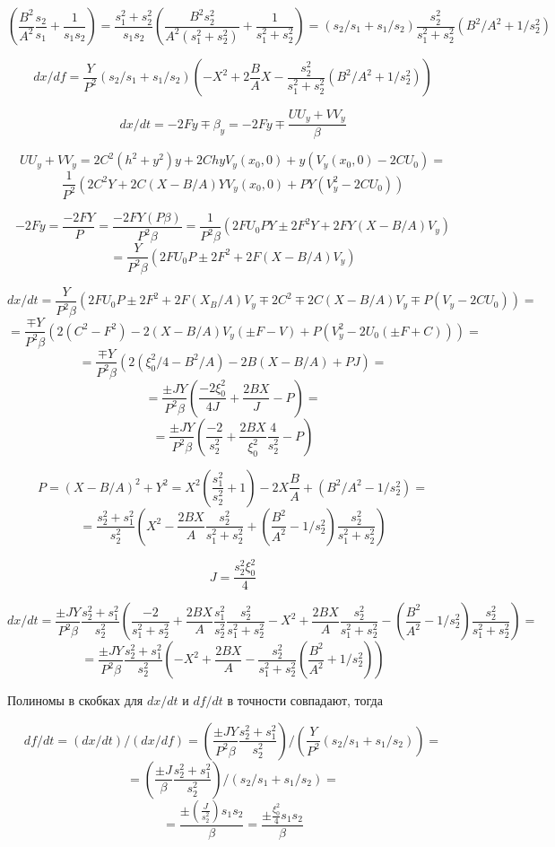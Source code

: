 $$(\frac{B^2}{A^2}\frac{s_2}{s_1}+ \frac{1}{s_1 s_2}) = \frac{s_1^2+s_2^2}{s_1 s_2} (\frac{B^2 s_2^2}{A^2(s_1^2+s_2^2)} + \frac{1}{s_1^2+s_2^2}) = (s_2/s_1 + s_1/s_2) \frac{s_2^2}{s_1^2+s_2^2} (B^2/A^2 + 1/s_2^2)$$

$$dx/df = \frac{Y}{P^2}(s_2/s_1 + s_1/s_2) \left(-X^2 + 2 \frac{B}{A}X - \frac{s_2^2}{s_1^2+s_2^2}(B^2/A^2+1/s_2^2) \right)$$


$$dx/dt = -2Fy \mp \beta_y = -2Fy \mp \frac{UU_y+VV_y}{\beta}$$

$$UU_y+VV_y = 2C^2 (h^2+y^2)y + 2Chy V_y(x_0,0) + y (V_y(x_0,0)-2CU_0) = $$
$$\frac{1}{P^2} \left( 2C^2Y + 2C(X-B/A)Y V_y(x_0,0) + P Y (V_y^2-2CU_0) \right)$$

$$-2Fy = \frac{-2FY}{P} = \frac{-2FY (P \beta)}{P^2 \beta} = \frac{1}{P^2 \beta} \left( 2FU_0PY \pm 2F^2 Y + 2FY (X-B/A) V_y \right)$$
$$=\frac{Y}{P^2 \beta} \left( 2FU_0P \pm 2F^2  + 2F (X-B/A) V_y \right)$$

$$dx/dt = \frac{Y}{P^2 \beta} \left( 2FU_0 P \pm 2F^2 + 2F(X_B/A)V_y \mp 2C^2 \mp 2C(X-B/A)V_y \mp P(V_y-2CU_0) \right) = $$
$$=\frac{\mp Y}{P^2 \beta} \left( 2(C^2-F^2) - 2(X-B/A)V_y (\pm F - V) + P(V_y^2 - 2U_0 (\pm F + C)) \right) = $$
$$=\frac{\mp Y}{P^2 \beta} \left( 2(\xi_0^2/4 - B^2/A) - 2B(X-B/A) + PJ \right)= $$
$$=\frac{\pm J Y}{P^2 \beta} \left( \frac{-2 \xi_0^2}{4J} + \frac{2BX}{J} - P \right) = $$
$$=\frac{\pm J Y}{P^2 \beta} \left( \frac{-2}{s_2^2} + \frac{2BX}{\xi_0^2} \frac{4}{s_2^2} - P \right)$$


$$P = (X-B/A)^2 +Y^2 = X^2(\frac{s_1^2}{s_2^2}+1) -2X \frac{B}{A} + (B^2/A^2 - 1/s_2^2)=$$
$$=\frac{s_2^2+s_1^2}{s_2^2} \left( X^2 - \frac{2BX}{A} \frac{s_2^2}{s_1^2+s_2^2} + (\frac{B^2}{A^2}-1/s_2^2)\frac{s_2^2}{s_1^2+s_2^2} \right)$$

$$J = \frac{s_2^2 \xi_0^2}{4}$$

$$dx/dt = \frac{\pm J Y}{P^2 \beta} \frac{s_2^2+s_1^2}{s_2^2} \left( \frac{-2}{s_1^2+s_2^2} + \frac{2BX}{A} \frac{s_1^2}{s_2^2} \frac{s_2^2}{s_1^2+s_2^2} -X^2 + \frac{2BX}{A}\frac{s_2^2}{s_1^2+s_2^2} - (\frac{B^2}{A^2} - 1/s_2^2) \frac{s_2^2}{s_1^2+s_2^2} \right)=$$
$$=\frac{\pm J Y}{P^2 \beta} \frac{s_2^2+s_1^2}{s_2^2} \left( -X^2 + \frac{2BX}{A} - \frac{s_2^2}{s_1^2+s_2^2}(\frac{B^2}{A^2}+1/s_2^2) \right)$$

Полиномы в скобках для $dx/dt$ и $df/dt$ в точности совпадают, тогда

$$df/dt = (dx/dt)/(dx/df) = \left( \frac{\pm J Y}{P^2 \beta} \frac{s_2^2+s_1^2}{s_2^2} \right) / \left( \frac{Y}{P^2}(s_2/s_1 + s_1/s_2) \right) = $$
$$=(\frac{\pm J}{\beta} \frac{s_2^2+s_1^2}{s_2^2})/(s_2/s_1+s_1/s_2) = $$
$$=\frac{\pm(\frac{J}{s_2^2}) s_1s_2}{\beta} = \frac{\pm \frac{\xi_0^2}{4} s_1s_2}{\beta}$$

